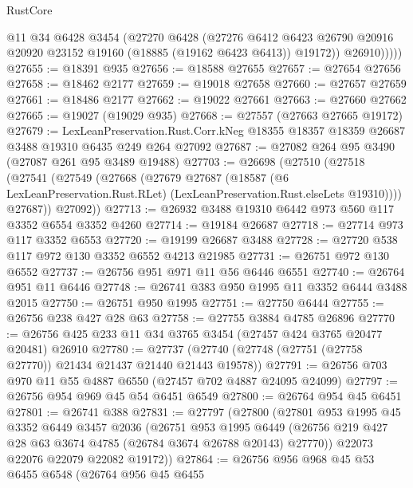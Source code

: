 \begin{lexlean}{RustCore}
\begin{coremodule}
              @11
              @34
              @6428
              @3454
              (@27270
                @6428
                (@27276
                  @6412
                  @6423
                  @26790
                  @20916
                  @20920
                  @23152
                  @19160
                  (@18885 (@19162 @6423 @6413))
                  @19172))
              @26910)))))
@27655 := @18391 @935
@27656 := @18588 @27655
@27657 := @27654 @27656
@27658 := @18462 @2177
@27659 := @19018 @27658
@27660 := @27657 @27659
@27661 := @18486 @2177
@27662 := @19022 @27661
@27663 := @27660 @27662
@27665 := @19027 (@19029 @935)
@27668 := @27557 (@27663 @27665 @19172)
@27679 := LexLeanPreservation.Rust.Corr.kNeg
    @18355
    @18357
    @18359
    @26687
    @3488
    @19310
    @6435
    @249
    @264
    @27092
@27687 := @27082 @264 @95 @3490 (@27087 @261 @95 @3489 @19488)
@27703 := @26698
    (@27510
      (@27518
        (@27541
          (@27549
            (@27668
              (@27679
                @27687
                (@18587
                  (@6 LexLeanPreservation.Rust.RLet)
                  (LexLeanPreservation.Rust.elseLets @19310))))
            @27687))
        @27092))
@27713 := @26932 @3488 @19310 @6442 @973 @560 @117 @3352 @6554 @3352 @4260
@27714 := @19184 @26687
@27718 := @27714 @973 @117 @3352 @6553
@27720 := @19199 @26687 @3488
@27728 := @27720 @538 @117 @972 @130 @3352 @6552 @4213 @21985
@27731 := @26751 @972 @130 @6552
@27737 := @26756 @951 @971 @11 @56 @6446 @6551
@27740 := @26764 @951 @11 @6446
@27748 := @26741 @383 @950 @1995 @11 @3352 @6444 @3488 @2015
@27750 := @26751 @950 @1995
@27751 := @27750 @6444
@27755 := @26756 @238 @427 @28 @63
@27758 := @27755 @3884 @4785 @26896
@27770 := @26756 @425 @233 @11 @34 @3765 @3454 (@27457 @424 @3765 @20477 @20481) @26910
@27780 := @27737 (@27740 (@27748 (@27751 (@27758 @27770)) @21434 @21437 @21440 @21443 @19578))
@27791 := @26756 @703 @970 @11 @55 @4887 @6550 (@27457 @702 @4887 @24095 @24099)
@27797 := @26756 @954 @969 @45 @54 @6451 @6549
@27800 := @26764 @954 @45 @6451
@27801 := @26741 @388
@27831 := @27797
    (@27800
      (@27801
        @953
        @1995
        @45
        @3352
        @6449
        @3457
        @2036
        (@26751
          @953
          @1995
          @6449
          (@26756 @219 @427 @28 @63 @3674 @4785 (@26784 @3674 @26788 @20143) @27770))
        @22073
        @22076
        @22079
        @22082
        @19172))
@27864 := @26756
    @956
    @968
    @45
    @53
    @6455
    @6548
    (@26764
      @956
      @45
      @6455

\end{coremodule}
\end{lexlean}
